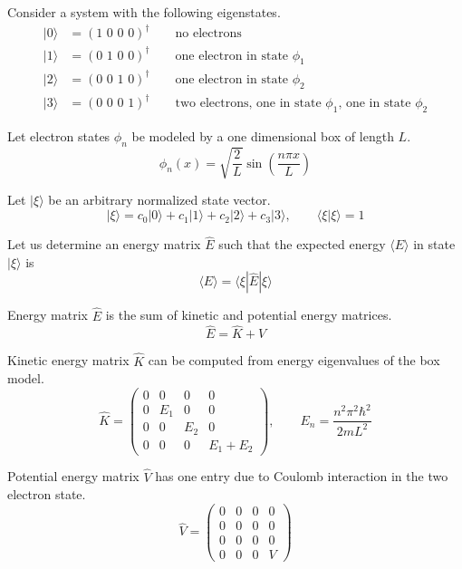 \documentclass[12pt]{article}
\begin{document}
\noindent
Consider a system with the following eigenstates.
\begin{align*}
|0\rangle&=(\text{1 0 0 0})^\dag\qquad\text{no electrons}\\
|1\rangle&=(\text{0 1 0 0})^\dag\qquad\text{one electron in state $\phi_1$}\\
|2\rangle&=(\text{0 0 1 0})^\dag\qquad\text{one electron in state $\phi_2$}\\
|3\rangle&=(\text{0 0 0 1})^\dag\qquad\text{two electrons, one in state $\phi_1$, one in state $\phi_2$}
\end{align*}

\noindent
Let electron states $\phi_n$ be modeled by a one dimensional box of length $L$.
\begin{equation*}
\phi_n(x)=\sqrt{\frac{2}{L}}\sin\left(\frac{n\pi x}{L}\right)
\end{equation*}

\noindent
Let $|\xi\rangle$ be an arbitrary normalized state vector.
\begin{equation*}
|\xi\rangle=c_0|0\rangle+c_1|1\rangle+c_2|2\rangle+c_3|3\rangle,\qquad\langle\xi|\xi\rangle=1
\end{equation*}

\noindent
Let us determine an energy matrix $\hat{E}$ such that the expected
energy $\langle E \rangle$ in state $|\xi\rangle$ is
\begin{equation*}
\langle E\rangle=\langle\xi|\hat{E}|\xi\rangle
\end{equation*}

\noindent
Energy matrix $\hat{E}$ is the sum of kinetic and potential energy matrices.
\begin{equation*}
\hat{E}=\hat{K}+\hat{V}
\end{equation*}

\noindent
Kinetic energy matrix $\hat{K}$ can be computed from energy eigenvalues of the box model.
\begin{equation*}
\hat{K}=\begin{pmatrix}
0 & 0 & 0 & 0\\
0 & E_1 & 0 & 0\\
0 & 0 & E_2 & 0\\
0 & 0 & 0 & E_1+E_2
\end{pmatrix},
\qquad
E_n=\frac{n^2\pi^2\hbar^2}{2mL^2}
\end{equation*}

\noindent
Potential energy matrix $\hat{V}$ has one entry due to Coulomb interaction in the two electron state.
\begin{equation*}
\hat{V}=
\begin{pmatrix}
0 & 0 & 0 & 0\\
0 & 0 & 0 & 0\\
0 & 0 & 0 & 0\\
0 & 0 & 0 & V
\end{pmatrix}
\end{equation*}
\end{document}
